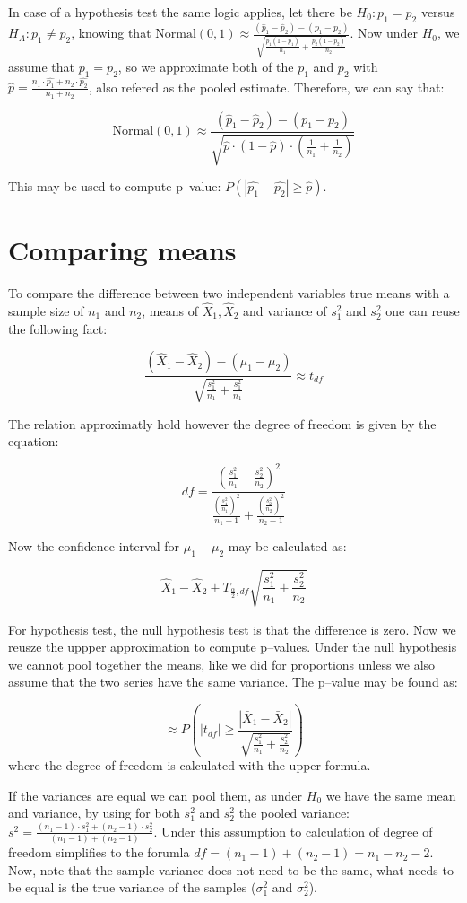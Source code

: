 In case of a hypothesis test the same logic applies, let there be $H_0: p_1 =
p_2$ versus $H_A: p_1 \neq p_2$, knowing that $ \mbox{Normal}(0,1) \approx
\frac{(\hat{p}_1 - \hat{p}_2) - (p_1 -
p_2)}{\sqrt{\frac{p_1(1-p_1)}{n_1}+\frac{p_2(1-p_2)}{n_2}}}$. Now under $H_0$,
we assume that $p_1=p_2$, so we approximate both of the $p_1$ and $p_2$ with 
$\hat{p}=\frac{n_1\cdot \hat{p_1} + n_2 \cdot \hat{p_2}}{n_1 + n_2}$, also
refered as the pooled estimate. Therefore, we can say that: 

\[ \mbox{Normal}(0,1) \approx \frac{(\hat{p}_1 - \hat{p}_2) - (p_1 -
p_2)}{\sqrt{\hat{p}\cdot(1-\hat{p})\cdot\left(\frac{1}{n_1} +
\frac{1}{n_2}\right)}}
\]

This may be used to compute p--value: $P(|\hat{p_1}-\hat{p_2}| \geq \hat{p})$.

\section{Comparing means}

To compare the difference between two independent variables true means with a
sample size of $n_1$ and $n_2$, means of $\hat{X}_1, \hat{X}_2$ and variance of
$s_1^2$ and $s_2^2$ one can reuse the following fact:

\[
\frac{(\hat{X}_1-\hat{X}_2)-(\mu_1-\mu_2)}{\sqrt{\frac{s_1^2}{n_1}+\frac{s_1^2}{n_1}}}
\approx t_{df}
\]

The relation approximatly hold however the degree of freedom is given by the
equation:

\[ df = \frac{\left(\frac{s_1^2 }{n_1} + \frac{s_2^2 }{n_2} \right)^2} {
\frac{\left(\frac{s_1^2 }{n_1}\right)^2}{n_1-1} + \frac{\left(\frac{s_2^2
}{n_2}\right)^2}{n_2-1} } 
\]

Now the confidence interval for $\mu_1-\mu_2$ may be calculated as:

\[ \hat{X}_1 - \hat{X}_2 \pm T_{\frac{\alpha}{2}, df} \sqrt{\frac{s_1^2}{n_1}
+ \frac{s_2^2}{n_2}}
\]

For hypothesis test, the null hypothesis test is that the difference is zero.
Now we reusze the uppper approximation to compute p--values. Under the null
hypothesis we cannot pool together the means, like we did for proportions unless
we also assume that the two series have the same variance. The p--value may be
found as:

\[ \approx P \left( |t_{df}| \geq
\frac{|\bar{X}_1-\bar{X}_2|}{\sqrt{\frac{s_1^2}{n_1} + \frac{s_2^2}{n_2}}} \right) 
\] where the degree of freedom is calculated with the upper formula.

If the variances are equal we can pool them, as under $H_0$ we have the same
mean and variance, by using for both $s_1^2$ and $s_2^2$ the pooled variance:
$s^2 = \frac{(n_1-1)\cdot s_1^2 + (n_2-1)\cdot s_2^2}{(n_1-1)+
(n_2-1)}$. Under this assumption to calculation of degree of freedom simplifies
to the forumla $df = (n_1-1)+(n_2-1) = n_1 - n_2 - 2$. Now, note that the
sample variance does not need to be the same, what needs to be equal is the true
variance of the samples ($\sigma_1^2$ and $\sigma_2^2$).